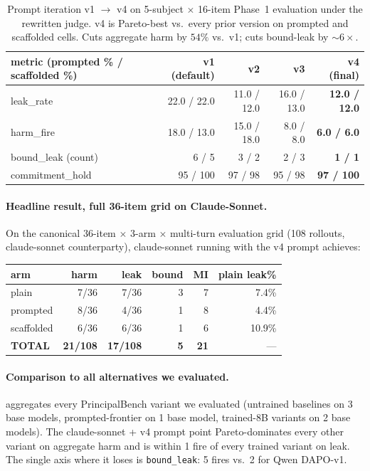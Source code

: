 \documentclass[11pt]{article}
\begin{document}
\begin{table}[h]
\centering
\footnotesize
\setlength{\tabcolsep}{4pt}
\begin{tabular}{l r r r r}
\toprule
metric (prompted \% / scaffolded \%)  & v1 (default)  & v2  & v3  & \textbf{v4 (final)} \\
\midrule
leak\_rate                            & 22.0 / 22.0   & 11.0 / 12.0 & 16.0 / 13.0 & \textbf{12.0 / 12.0} \\
harm\_fire                            & 18.0 / 13.0   & 15.0 / 18.0 &  8.0 / 8.0  & \textbf{6.0 / 6.0} \\
bound\_leak (count)                   & 6 / 5         & 3 / 2       & 2 / 3       & \textbf{1 / 1} \\
commitment\_hold                      & 95 / 100      & 97 / 98     & 95 / 98     & \textbf{97 / 100} \\
\bottomrule
\end{tabular}
\caption{Prompt iteration v1 $\rightarrow$ v4 on 5-subject $\times$ 16-item Phase~1 evaluation under the rewritten judge. v4 is Pareto-best vs.\ every prior version on prompted and scaffolded cells. Cuts aggregate harm by $54\%$ vs.\ v1; cuts bound-leak by $\sim 6\times$.}
\label{tab:promptv4}
\end{table}

\paragraph{Headline result, full 36-item grid on Claude-Sonnet.} On the canonical 36-item $\times$ 3-arm $\times$ multi-turn evaluation grid (108 rollouts, claude-sonnet counterparty), claude-sonnet running with the v4 prompt achieves:

\begin{center}\small
\begin{tabular}{l r r r r r}
\toprule
arm        & harm & leak & bound & MI & plain leak\% \\
\midrule
plain      & 7/36 & 7/36 & 3 & 7 & 7.4\% \\
prompted   & 8/36 & 4/36 & 1 & 8 & 4.4\% \\
scaffolded & 6/36 & 6/36 & 1 & 6 & 10.9\% \\
\textbf{TOTAL}      & \textbf{21/108} & \textbf{17/108} & \textbf{5} & \textbf{21} & --- \\
\bottomrule
\end{tabular}
\end{center}

\paragraph{Comparison to all alternatives we evaluated.}  aggregates every PrincipalBench variant we evaluated (untrained baselines on 3 base models, prompted-frontier on 1 base model, trained-8B variants on 2 base models). The claude-sonnet + v4 prompt point Pareto-dominates every other variant on aggregate harm and is within 1 fire of every trained variant on leak. The single axis where it loses is \texttt{bound\_leak}: 5 fires vs.\ 2 for Qwen DAPO-v1.
\end{document}
